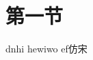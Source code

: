 \documentclass[11pt,a4paper,oneside]{article}
\newcommand{\csection}[1]{\section{\heiti\large #1}}
\begin{document}
\csection{第一节}
dnhi hewiwo ef\fangsong 仿宋
\end{document}

